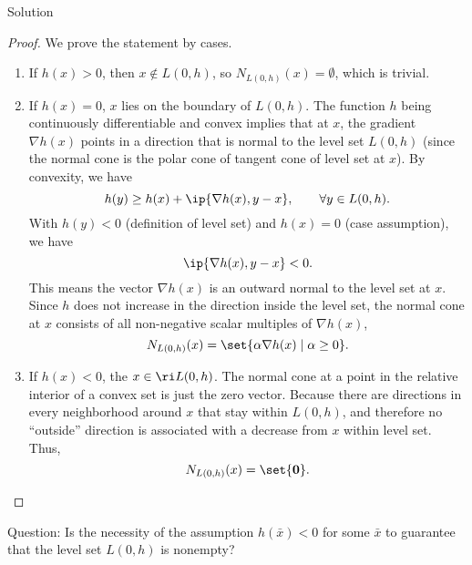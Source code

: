 \documentclass{article}
\begin{document}
\begin{solution}
    {Solution}
    \begin{proof}
        We prove the statement by cases.
        \begin{enumerate}
            \item If $h(x)>0$, then $x\notin L(0,h)$, so $N_{L(0,h)}(x)=\emptyset$, which is trivial.
            \item If $h(x)=0$, $x$ lies on the boundary of $L(0, h)$. The function $h$ being continuously differentiable and convex implies that at $x$, the gradient $\nabla h(x)$ points in a direction that is normal to the level set $L(0, h)$ (since the normal cone is the polar cone of tangent cone of level set at $x$). By convexity, we have \[h(y)\geq h(x)+\ip{\nabla h(x), y-x}, \qquad \forall y\in L(0, h).\] With $h(y)<0$ (definition of level set) and $h(x)=0$ (case assumption), we have \[\ip{\nabla h(x), y-x}<0.\] This means the vector $\nabla h(x)$ is an outward normal to the level set at $x$. Since $h$ does not increase in the direction inside the level set, the normal cone at $x$ consists of all non-negative scalar multiples of $\nabla h(x)$, \ie \[N_{L(0,h)}(x)=\set{\alpha\nabla h(x)\mid \alpha\geq 0}.\]
            \item If $h(x)<0$, the $x\in\ri L(0, h)$. The normal cone at a point in the relative interior of a convex set is just the zero vector. Because there are directions in every neighborhood around $x$ that stay within $L(0, h)$, and therefore no ``outside'' direction is associated with a decrease from $x$ within level set. Thus, \[N_{L(0,h)}(x)=\set{\bm{0}}.\]
        \end{enumerate}
    \end{proof}
    Question: Is the necessity of the assumption $h(\bar{x})<0$ for some $\bar{x}$ to guarantee that the level set $L(0,h)$ is nonempty?
\end{solution}
\end{document}
